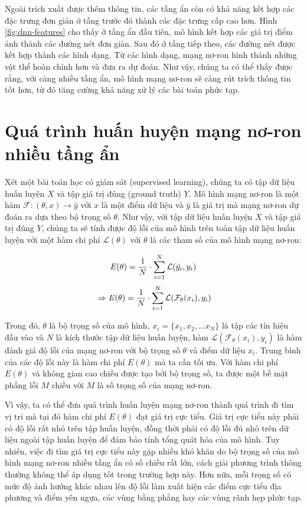 Ngoài trích xuất được thêm thông tin, các tầng ẩn còn có khả năng kết hợp các đặc trưng đơn giản ở tầng trước đó thành các đặc trưng cấp cao hơn. Hình \ref{fig:dnn-features} cho thấy ở tầng ẩn đầu tiên, mô hình kết hợp các giá trị điểm ảnh thành các đường nét đơn giản. Sau đó ở tầng tiếp theo, các đường nét được kết hợp thành các hình dạng. Từ các hình dạng, mạng nơ-ron hình thành những vật thể hoàn chỉnh hơn và đưa ra dự đoán. Như vậy, chúng ta có thể thấy được rằng, với càng nhiều tầng ẩn, mô hình mạng nơ-ron sẽ càng rút trích thông tin tốt hơn, từ đó tăng cường khả năng xử lý các bài toán phức tạp.

\section{Quá trình huấn huyện mạng nơ-ron nhiều tầng ẩn}

Xét một bài toán học có giám sát (supervised learning), chúng ta có tập dữ liệu huấn luyện $X$ và tập giá trị đúng (ground truth) $Y$. Mô hình mạng nơ-ron là một hàm $\mathcal{F}: (\theta, x) \rightarrow \hat{y}$ với $x$ là một điểm dữ liệu và $\hat{y}$ là giá trị mà mạng nơ-ron dự đoán ra dựa theo bộ trọng số $\theta$. Như vậy, với tập dữ liệu huấn luyện $X$ và tập giá trị đúng $Y$, chúng ta sẽ tính được độ lỗi của mô hình trên toàn tập dữ liệu huấn luyện với một hàm chi phí $\mathcal{L}(\theta)$ với $\theta$ là các tham số của mô hình mạng nơ-ron:

\begin{equation}
\label{eqn:E-y}
\mathbf{\it{E}(\theta)} = \frac{1}{N}\cdot \sum_{i=1}^{N}\mathcal{L}(\hat{y_i}, y_i)
\end{equation}
\begin{equation}
\label{eqn:E-Fx}
\\\Rightarrow \mathbf{\it{E}(\theta)} = \frac{1}{N}\cdot \sum_{i=1}^{N}\mathcal{L}(\mathcal{F}_\theta( x_i), y_i)
\end{equation}

Trong đó, $\theta$ là bộ trọng số của mô hình, $x_i = \{x_1, x_2,...x_N\}$ là tập các tín hiệu đầu vào và $N$ là kích thước tập dữ liệu huấn luyện, hàm $\mathcal{L}(\mathcal{F}_\theta( x_i), y_i)$ là hàm đánh giá độ lỗi của mạng nơ-ron với bộ trọng số $\theta$ và điểm dữ liệu $x_i$. Trung bình của các độ lỗi này là hàm chi phí $E(\theta)$ mà ta cần tối ưu. Với hàm chi phí $E(\theta)$ và không gian cao chiều được tạo bởi bộ trọng số, ta được một bề mặt phẳng lỗi $M$ chiều với $M$ là số trọng số của mạng nơ-ron.

Vì vậy, ta có thể đưa quá trình huấn luyện mạng nơ-ron thành quá trình đi tìm vị trí mà tại đó hàm chi phí $E(\theta)$ đạt giá trị cực tiểu. Giá trị cực tiểu này phải có độ lỗi rất nhỏ trên tập huấn luyện, đồng thời phải có độ lỗi đủ nhỏ trên dữ liệu ngoài tập huấn luyện để đảm bảo tính tổng quát hóa của mô hình. Tuy nhiên, việc đi tìm giá trị cực tiểu này gặp nhiều khó khăn do bộ trọng số của mô hình mạng nơ-ron nhiều tầng ẩn có số chiều rất lớn, cách giải phương trình thông thường không thể áp dụng tốt trong trường hợp này. Hơn nữa, mỗi trọng số có mức độ ảnh hưởng khác nhau lên độ lỗi làm xuất hiện các điểm cực tiểu địa phương và điểm yên ngựa, các vùng bằng phẳng hay các vùng rãnh hẹp phức tạp.

